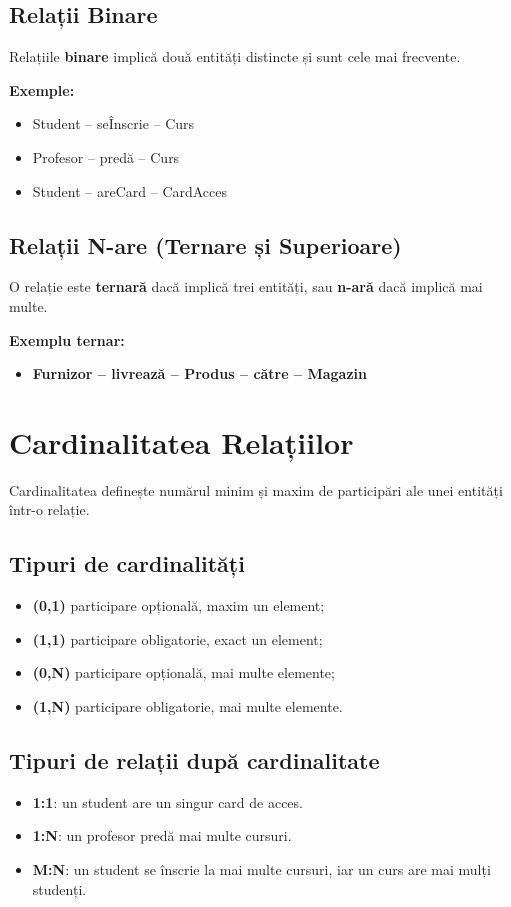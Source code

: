 \documentclass[12pt,a4paper]{article}
\begin{document}
\subsection*{Relații Binare}
Relațiile \textbf{binare} implică două entități distincte și sunt cele mai frecvente.

\textbf{Exemple:}
\begin{itemize}[noitemsep]
    \item Student -- seÎnscrie -- Curs
    \item Profesor -- predă -- Curs
    \item Student -- areCard -- CardAcces
\end{itemize}

\subsection*{Relații N-are (Ternare și Superioare)}
O relație este \textbf{ternară} dacă implică trei entități, sau \textbf{n-ară} dacă implică mai multe.

\textbf{Exemplu ternar:}
\begin{itemize}[noitemsep]
    \item \textbf{Furnizor -- livrează -- Produs -- către -- Magazin}
\end{itemize}

\section{Cardinalitatea Relațiilor}
Cardinalitatea definește numărul minim și maxim de participări ale unei entități
într-o relație.

\subsection*{Tipuri de cardinalități}
\begin{itemize}[noitemsep]
    \item \textbf{(0,1)} participare opțională, maxim un element;
    \item \textbf{(1,1)} participare obligatorie, exact un element;
    \item \textbf{(0,N)} participare opțională, mai multe elemente;
    \item \textbf{(1,N)} participare obligatorie, mai multe elemente.
\end{itemize}

\subsection*{Tipuri de relații după cardinalitate}
\begin{itemize}[noitemsep]
    \item \textbf{1:1}: un student are un singur card de acces.
    \item \textbf{1:N}: un profesor predă mai multe cursuri.
    \item \textbf{M:N}: un student se înscrie la mai multe cursuri, iar un curs are mai mulți studenți.
\end{itemize}
\end{document}
